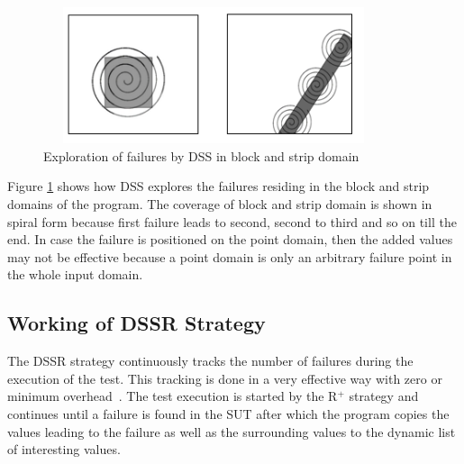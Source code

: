 \bigskip
\bigskip
\begin{figure}[ht]
\centering
\includegraphics[width=10cm,height=4cm]{chapter4/block2.png}
\bigskip
\caption{Exploration of failures by DSS in block and strip domain}
\label{fig:block2}
\end{figure}
\bigskip
\bigskip

Figure \ref{fig:block2} shows how DSS explores the failures residing in the block and strip domains of the program. The coverage of block and strip domain is shown in spiral form because first failure leads to second, second to third and so on till the end. In case the failure is positioned on the point domain, then the added values may not be effective because a point domain is only an arbitrary failure point in the whole input domain.

\subsection{Working of DSSR Strategy}

The DSSR strategy continuously tracks the number of failures during the execution of the test. This tracking is done in a very effective way with zero or minimum overhead~\cite{leitner2009effectiveness}. The test execution is started by the R$^+$ strategy and continues until a failure is found in the SUT after which the program copies the values leading to the failure as well as the surrounding values to the dynamic list of interesting values. 

